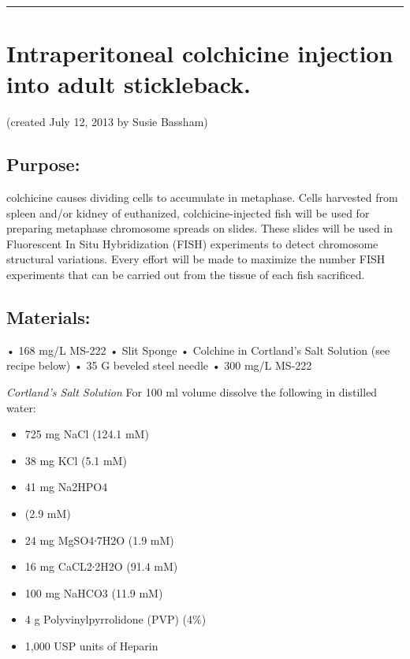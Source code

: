 \documentclass[
]{book}
\providecommand{\tightlist}{%
  \setlength{\itemsep}{0pt}\setlength{\parskip}{0pt}}
\begin{document}
\begin{center}\rule{0.5\linewidth}{0.5pt}\end{center}

\hypertarget{intraperitoneal-colchicine-injection-into-adult-stickleback.}{%
\section{Intraperitoneal colchicine injection into adult stickleback.}\label{intraperitoneal-colchicine-injection-into-adult-stickleback.}}

(created July 12, 2013 by Susie Bassham)

\hypertarget{purpose-4}{%
\subsection{Purpose:}\label{purpose-4}}

colchicine causes dividing cells to accumulate in metaphase. Cells harvested from spleen and/or kidney of euthanized, colchicine-injected fish will be used for preparing metaphase chromosome spreads on slides. These slides will be used in Fluorescent In Situ Hybridization (FISH) experiments to detect chromosome structural variations. Every effort will be made to maximize the number FISH experiments that can be carried out from the tissue of each fish sacrificed.

\hypertarget{materials-8}{%
\subsection{Materials:}\label{materials-8}}

• 168 mg/L MS-222
• Slit Sponge
• Colchine in Cortland's Salt Solution (see recipe below)
• 35 G beveled steel needle
• 300 mg/L MS-222

\emph{Cortland's Salt Solution}
For 100 ml volume dissolve the following in distilled water:

\begin{itemize}
\tightlist
\item
  725 mg NaCl (124.1 mM)
\item
  38 mg KCl (5.1 mM)
\item
  41 mg Na2HPO4
\item
  (2.9 mM)
\item
  24 mg MgSO4∙7H2O (1.9 mM)
\item
  16 mg CaCL2∙2H2O (91.4 mM)
\item
  100 mg NaHCO3 (11.9 mM)
\item
  4 g Polyvinylpyrrolidone (PVP) (4\%)
\item
  1,000 USP units of Heparin
\end{itemize}
\end{document}
